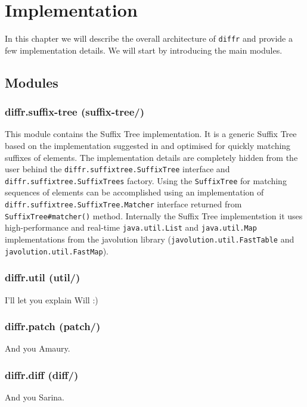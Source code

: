 \chapter{Implementation}

In this chapter we will describe the overall architecture of \texttt{diffr} and provide a few implementation details. We will start by introducing the main modules.

\section{Modules}

\subsection{diffr.suffix-tree (suffix-tree/)}
This module contains the Suffix Tree implementation. It is a generic Suffix Tree based on the implementation suggested in \cite{Ukkonen95} and optimised for quickly matching suffixes of elements. The implementation details are completely hidden from the user behind the \texttt{diffr.suffixtree.SuffixTree} interface and \texttt{diffr.suffixtree.SuffixTrees} factory. Using the \texttt{SuffixTree} for matching sequences of elements can be accomplished using an implementation of \texttt{diffr.suffixtree.SuffixTree.Matcher} interface returned from \texttt{SuffixTree\#matcher()} method. Internally the Suffix Tree implementstion it uses high-performance and real-time \texttt{java.util.List} and \texttt{java.util.Map} implementations from the javolution library (\texttt{javolution.util.FastTable} and \texttt{javolution.util.FastMap})\cite{javolution}. 

\subsection{diffr.util (util/)}

I'll let you explain Will :)

\subsection{diffr.patch (patch/)} 

And you Amaury.

\subsection{diffr.diff (diff/)}

And you Sarina.

